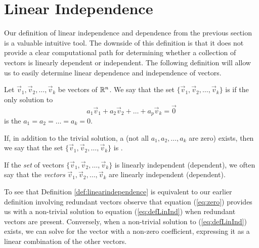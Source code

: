 \documentclass{ximera}
\begin{document}
\section*{Linear Independence}

Our definition of linear independence and dependence from the previous section is a valuable intuitive tool.  The downside of this definition is that it does not provide a clear computational path for determining whether a collection of vectors is linearly dependent or independent.  The following definition will allow us to easily determine linear dependence and independence of vectors.


\begin{definition}\label{def:linearindependence}
Let $\vec{v}_1, \vec{v}_2,\ldots ,\vec{v}_k$ be vectors of $\mathbb{R}^n$.  We say that the set $\{\vec{v}_1, \vec{v}_2,\ldots ,\vec{v}_k\}$ is  if the only solution to 
\begin{equation}\label{eq:defLinInd}a_1\vec{v}_1+a_2\vec{v}_2+\ldots +a_p\vec{v}_k=\vec{0}\end{equation}
is the  $a_1=a_2=\ldots =a_k=0$.

If, in addition to the trivial solution, a  (not all $a_1, a_2,\ldots ,a_k$ are zero) exists, then we say that the set $\{\vec{v}_1, \vec{v}_2,\ldots ,\vec{v}_k\}$ is .
\end{definition}

If the {\it set} of vectors $\{\vec{v}_1, \vec{v}_2,\ldots ,\vec{v}_k\}$ is linearly independent (dependent), we often say that the {\it vectors} $\vec{v}_1, \vec{v}_2,\ldots ,\vec{v}_k$ are linearly independent (dependent).

To see that Definition \ref{def:linearindependence} is equivalent to our earlier definition involving redundant vectors observe that equation (\ref{eq:zero}) provides us with a non-trivial solution to equation (\ref{eq:defLinInd}) when redundant vectors are present.  Conversely, when a non-trivial solution to (\ref{eq:defLinInd}) exists, we can solve for the vector with a non-zero coefficient, expressing it as a linear combination of the other vectors.
\end{document}
